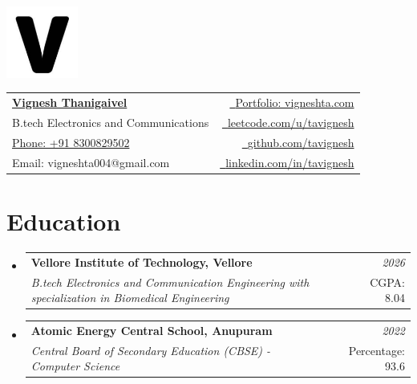 \documentclass[a4paper,11pt]{article}
\makeatletter
\newcommand{\resumeSubheading}[4]{
\vspace{0.5mm}\item
    \begin{tabular*}{0.98\textwidth}[t]{l@{\extracolsep{\fill}}r}
        \textbf{#1} & \textit{\footnotesize{#4}} \\
        \textit{\footnotesize{#3}} &  \footnotesize{#2}\\
    \end{tabular*}
    \vspace{-2.4mm}
}
\newcommand{\resumeSubHeadingListStart}{\begin{itemize}[leftmargin=*,labelsep=0mm]}
\newcommand{\resumeSubHeadingListEnd}{\end{itemize}\vspace{2mm}}
\newcommand{\name}{\href{https://vigneshta.com}{Vignesh Thanigaivel}} %
\newcommand{\roll}{B.tech Electronics and Communications} %
\newcommand{\phone}{Portfolio: vigneshta.com}
\newcommand{\emailb}{leetcode.com/u/tavignesh}
\makeatother
\begin{document}
\selectfont


\parbox{2.35cm}{%
\includegraphics[width=2.35cm,clip]{v.png}}
\parbox{\dimexpr\linewidth-2.8cm\relax}{
\begin{tabularx}{\linewidth}{L r} 
  \textbf{\Large \name} & \href{https://vigneshta.com}{\raisebox{0.0\height}{\footnotesize \faGlobe}\ {\phone}}\\
  {\roll} & \href{https://leetcode.com/u/tavignesh/}{\raisebox{0.0\height}{\footnotesize \faCode}\ {\emailb}} \\
  {\href{tel:+918300829502}{Phone: +91 8300829502}} &  \href{https://github.com/tavignesh/}{\raisebox{0.0\height}{\footnotesize \faGithub}\ {github.com/tavignesh}} \\
  {Email: vigneshta004@gmail.com } & \href{https://www.linkedin.com/in/tavignesh}{\raisebox{0.0\height}{\footnotesize \faLinkedin}\ {linkedin.com/in/tavignesh}}
\end{tabularx}
}



\section{\textbf{Education}}
  \resumeSubHeadingListStart
    \resumeSubheading
      {Vellore Institute of Technology, Vellore}{CGPA: 8.04}
      {B.tech Electronics and Communication Engineering with specialization in Biomedical Engineering}{2026}
    \resumeSubheading
      {Atomic Energy Central School, Anupuram}{Percentage: 93.6}
      {Central Board of Secondary Education (CBSE) - Computer Science}{2022}
  \resumeSubHeadingListEnd
\vspace{-5.5mm}
%


\end{document}
